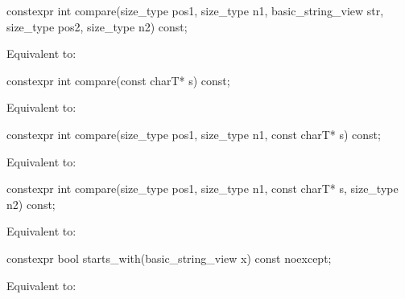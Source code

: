 %
\begin{itemdecl}
constexpr int compare(size_type pos1, size_type n1, basic_string_view str,
                      size_type pos2, size_type n2) const;
\end{itemdecl}

\begin{itemdescr}
\pnum
\effects
Equivalent to: 
\end{itemdescr}

%
\begin{itemdecl}
constexpr int compare(const charT* s) const;
\end{itemdecl}

\begin{itemdescr}
\pnum
\effects
Equivalent to: 
\end{itemdescr}

%
\begin{itemdecl}
constexpr int compare(size_type pos1, size_type n1, const charT* s) const;
\end{itemdecl}

\begin{itemdescr}
\pnum
\effects
Equivalent to: 
\end{itemdescr}

%
\begin{itemdecl}
constexpr int compare(size_type pos1, size_type n1, const charT* s, size_type n2) const;
\end{itemdecl}

\begin{itemdescr}
\pnum
\effects
Equivalent to: 
\end{itemdescr}

%
\begin{itemdecl}
constexpr bool starts_with(basic_string_view x) const noexcept;
\end{itemdecl}

\begin{itemdescr}
\pnum
\effects
Equivalent to: 
\end{itemdescr}

